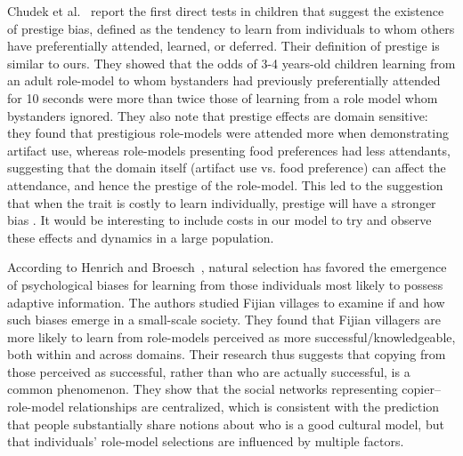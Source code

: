 \documentclass[12pt]{extarticle}
\begin{document}
Chudek et al.~\citep{prestige_cultural_learning} report the first direct tests in children that suggest the existence of prestige bias, defined as the tendency to learn from individuals to whom others have preferentially attended, learned, or deferred.
Their definition of prestige is similar to ours. They showed that the odds of 3-4 years-old children learning from an adult role-model to whom bystanders had previously preferentially attended for 10 seconds were more than twice those of learning from a role model whom bystanders ignored.
They also note that prestige effects are domain sensitive: they found that prestigious role-models were attended more when demonstrating artifact use, whereas role-models presenting food preferences had less attendants, suggesting that the domain itself (artifact use vs. food preference) can affect the attendance, and hence the prestige of the role-model.
This led to the suggestion that when the trait is costly to learn individually, prestige will have a stronger bias \citep{prestige_cultural_learning}.
It would be interesting to include costs in our model to try and observe these effects and dynamics in a large population.

According to Henrich and Broesch~\citep{fijian_social_bias}, natural selection has favored the emergence of psychological biases for learning from those individuals most likely to possess adaptive information. 
The authors studied Fijian villages to examine if and how such biases emerge in a small-scale society.
They found that Fijian villagers are more likely to learn from role-models perceived as more successful/knowledgeable, both within and across domains. Their research thus suggests that copying from those perceived as successful, rather than who are actually successful, is a common phenomenon. They show that the social networks representing copier--role-model relationships are centralized, which is consistent with the prediction that people substantially share notions about who is a good cultural model, but that individuals' role-model selections are influenced by multiple factors.
\end{document}
